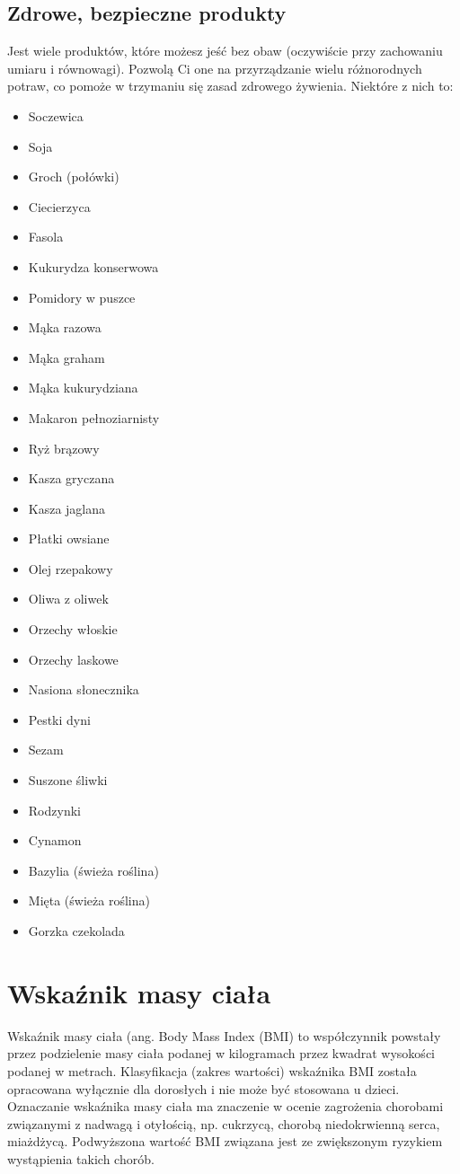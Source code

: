 \documentclass{article}
\begin{document}
\subsection{Zdrowe, bezpieczne produkty}
Jest wiele produktów, które możesz jeść bez obaw (oczywiście przy zachowaniu umiaru i równowagi). Pozwolą Ci one na przyrządzanie wielu różnorodnych potraw, co pomoże w trzymaniu się zasad zdrowego żywienia. Niektóre z nich to: 
\begin{multicols}{2}
\begin{itemize}
\item Soczewica 
\item Soja
\item Groch (połówki)
\item Ciecierzyca
\item Fasola 
\item Kukurydza konserwowa
\item Pomidory w puszce
\item Mąka razowa 
\item Mąka graham
\item Mąka kukurydziana
\item Makaron pełnoziarnisty
\item Ryż brązowy
\item Kasza gryczana
\item Kasza jaglana
\item Płatki owsiane
\item Olej rzepakowy
\item Oliwa z oliwek
\item Orzechy włoskie
\item Orzechy laskowe
\item Nasiona słonecznika
\item Pestki dyni
\item Sezam
\item Suszone śliwki
\item Rodzynki
\item Cynamon
\item Bazylia (świeża roślina)
\item Mięta (świeża roślina)
\item Gorzka czekolada
\end{itemize}
\end{multicols} 
\section{Wskaźnik masy ciała}
Wskaźnik masy ciała (ang. Body Mass Index (BMI) to współczynnik powstały przez podzielenie masy ciała podanej w kilogramach przez kwadrat wysokości podanej w metrach. Klasyfikacja (zakres wartości) wskaźnika BMI została opracowana wyłącznie dla dorosłych i nie może być stosowana u dzieci. \\
Oznaczanie wskaźnika masy ciała ma znaczenie w ocenie zagrożenia chorobami związanymi z nadwagą i otyłością, np. cukrzycą, chorobą niedokrwienną serca, miażdżycą. Podwyższona wartość BMI związana jest ze zwiększonym ryzykiem wystąpienia takich chorób.
\end{document}
